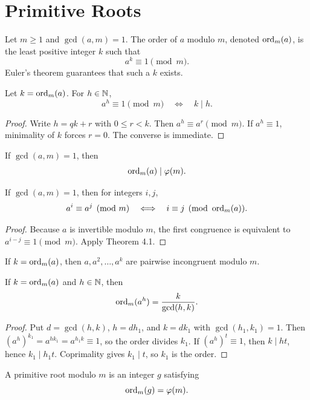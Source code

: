 \chapter{Primitive Roots}

\begin{de}
Let $m\ge1$ and $\gcd(a,m)=1$.  The order of $a$ modulo $m$, denoted $\operatorname{ord}_m(a)$, is the least positive integer $k$ such that
\[
 a^k\equiv1\pmod m.
\]
Euler's theorem guarantees that such a $k$ exists.
\end{de}

\begin{thm}
Let $k=\operatorname{ord}_m(a)$.  For $h\in\mathbb{N}$,
\[
 a^h\equiv1\pmod m\quad\Longleftrightarrow\quad k\mid h.
\]
\end{thm}
\begin{proof}
Write $h=qk+r$ with $0\le r<k$.  Then
$a^h\equiv a^r\pmod m$.  If $a^h\equiv1$, minimality of $k$ forces $r=0$.  The converse is immediate.
\end{proof}

\begin{cor}
If $\gcd(a,m)=1$, then
\[
 \operatorname{ord}_m(a)\mid\varphi(m).
\]
\end{cor}

\begin{thm}
If $\gcd(a,m)=1$, then for integers $i,j$,
\[
 a^i\equiv a^j\pmod m
 \quad\Longleftrightarrow\quad
 i\equiv j\pmod{\operatorname{ord}_m(a)}.
\]
\end{thm}
\begin{proof}
Because $a$ is invertible modulo $m$, the first congruence is equivalent to
$a^{i-j}\equiv1\pmod m$.  Apply Theorem 4.1.
\end{proof}

\begin{cor}
If $k=\operatorname{ord}_m(a)$, then $a,a^2,\ldots,a^k$ are pairwise incongruent modulo $m$.
\end{cor}

\begin{thm}
If $k=\operatorname{ord}_m(a)$ and $h\in\mathbb{N}$, then
\[
 \operatorname{ord}_m(a^h)=\frac{k}{\gcd(h,k)}.
\]
\end{thm}
\begin{proof}
Put $d=\gcd(h,k)$, $h=dh_1$, and $k=dk_1$ with $\gcd(h_1,k_1)=1$.  Then
$(a^h)^{k_1}=a^{hk_1}=a^{h_1k}\equiv1$, so the order divides $k_1$.
If $(a^h)^t\equiv1$, then $k\mid ht$, hence $k_1\mid h_1t$.  Coprimality gives $k_1\mid t$, so $k_1$ is the order.
\end{proof}

\begin{de}
A primitive root modulo $m$ is an integer $g$ satisfying
\[
 \operatorname{ord}_m(g)=\varphi(m).
\]
\end{de}

